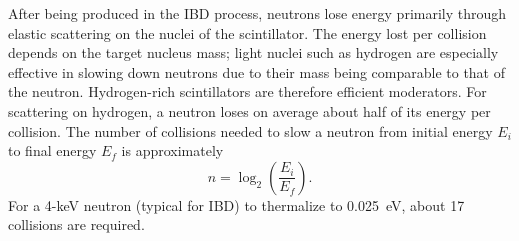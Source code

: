 \documentclass[tightenlines,
twocolumn,prl,notitlepage,nofootinbib,preprintnumbers,longbibliography]{revtex4-1}
\begin{document}
After being produced in the IBD process, neutrons lose energy primarily through elastic scattering on the nuclei of the scintillator. The energy lost per collision depends on the target nucleus mass; light nuclei such as hydrogen are especially effective in slowing down neutrons due to their mass being comparable to that of the neutron. Hydrogen-rich scintillators are therefore efficient moderators. For scattering on hydrogen, a neutron loses on average about half of its energy per collision. The number of collisions needed to slow a neutron from initial energy $E_i$ to final energy $E_f$ is approximately
\[
n = \log_2\left(\frac{E_i}{E_f}\right).
\]
For a 4-keV neutron (typical for IBD) to thermalize to 0.025~eV, about 17 collisions are required.


\end{document}

